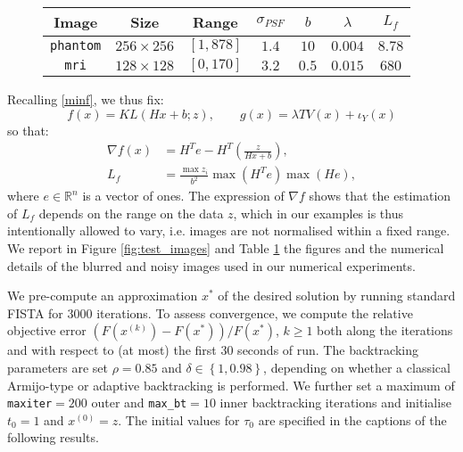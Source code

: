 \documentclass[conference]{IEEEtran}
\begin{document}
\begin{figure}[t!]
\begin{center}
		\scriptsize{
			\begin{tabular}{|c|c|c|c|c|c|c|}
				\hline
				\textbf{Image}   & \textbf{Size}   & \textbf{Range} & \textbf{$\sigma_{PSF}$} & \textbf{$b$} & \textbf{$\lambda$} &  \textbf{$L_f$} \\ \hline\hline
				\texttt{phantom} & $256\times 256$ & $[1,878]$        & $1.4$                   & $10$    & $0.004$            &  $8.78$       \\ \hline
				\texttt{mri}     & $128\times 128$ & $[0,170]$      & $3.2$                   & $0.5$        & $0.015$            &  $680$     \\ \hline
			\end{tabular}%
			\label{table:details_figs}
		}
\end{center}
\end{figure}

Recalling \eqref{minf}, we thus fix:
\[
f(x)=KL(Hx+b;z),\qquad g(x)=\lambda TV(x)+\iota_{Y}(x)
\]
so that:
\begin{align}  
    \nabla f(x) & = H^T e - H^T \left( \frac{z}{Hx + b}\right), \label{eq:parameters_PoisDeb}\\ L_f& =\frac{\max z_i}{b^2} \max (H^T e) \max(H e),\nonumber
\end{align}
where $e\in\mathbb{R}^n$ is a vector of ones. The expression of $\nabla f$ shows that the estimation of $L_f$  depends on the range on the data $z$, which in our examples is thus intentionally allowed to vary, i.e. images are not normalised within a fixed range. We report in Figure \ref{fig:test_images} and Table \ref{table:details_figs} the figures and the numerical details of the blurred and noisy images used in our numerical experiments.


We pre-compute an approximation $x^*$ of the desired solution by running standard FISTA for 3000 iterations. To assess convergence, we compute the relative objective error $(F(x^{(k)}) - F(x^*))/F(x^*)$, $k\geq 1$ both along the iterations and with respect to (at most) the first 30 seconds of run. The backtracking parameters are set $\rho=0.85$ and $\delta\in\left\{1,0.98 \right\}$, depending on whether a classical Armijo-type or adaptive backtracking is performed. We further set a maximum of \texttt{maxiter}$=200$ outer and \texttt{max\_bt}$=10$ inner backtracking iterations and initialise $t_0=1$ and $x^{(0)}=z$. The initial values for $\tau_0$ are specified in the captions of the following results.
\end{document}
